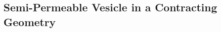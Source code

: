 \documentclass[9pt,twocolumn,twoside,lineno]{pnas-new}
\newif\ifTikz
\begin{document}
%
%

\subsection*{Semi-Permeable Vesicle in a Contracting Geometry}


\begin{figure*}[htp]
  \centering
  
  \caption{\label{fig:contractingComposite} (a) A semi-permeable vesicle
  passing through a contracting geometry similar to the experimental
  device in~\cite{}. The narrowest part of the channel is $1.6\mu$m, and
  the vesicle height is initially $10\mu$m.}
\end{figure*}



% 
 
\end{document}

